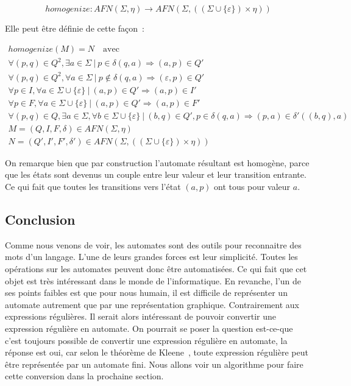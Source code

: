 \[
    homogenize: AFN(\Sigma, \eta) \to AFN(\Sigma, ((\Sigma \cup \{\varepsilon\}) \times \eta))
\]

Elle peut être définie de cette façon~:

\begin{gather*}
    homogenize(M) = N \quad \text{avec}                                                          \\
    \forall (p, q) \in Q^2, \exists a \in \Sigma ~|~ p \in \delta(q, a) \Rightarrow (a, p) \in Q' \\
    \forall (p, q) \in Q^2, \forall a \in \Sigma ~|~ p \notin \delta(q, a)
    \Rightarrow (\varepsilon, p) \in Q' \\
    \forall p \in I, \forall a \in \Sigma \cup \{\varepsilon\} ~|~ (a, p) \in Q' \Rightarrow (a, p) \in I' \\
    \forall p \in F, \forall a \in \Sigma \cup \{\varepsilon\} ~|~ (a, p) \in Q' \Rightarrow (a, p) \in F' \\
    \forall (p, q) \in Q, \exists a \in \Sigma, \forall b \in \Sigma \cup \{\varepsilon\} ~|~ (b, q) \in Q', p \in \delta(q, a) \Rightarrow (p, a) \in \delta'((b, q), a) \\
    M = (Q, I, F, \delta) \in AFN(\Sigma, \eta) \\
    N = (Q', I', F', \delta') \in AFN(\Sigma, ((\Sigma \cup \{\varepsilon\})
    \times \eta))
\end{gather*}

On remarque bien que par construction l'automate résultant est homogène, parce
que les états sont devenus un couple entre leur valeur et leur transition
entrante. Ce qui fait que toutes les transitions vers l'état \((a, p)\) ont
tous pour valeur \(a\).

\subsection{Conclusion}

Comme nous venons de voir, les automates sont des outils pour reconnaitre des
mots d'un langage. L'une de leurs grandes forces est leur simplicité. Toutes
les opérations sur les automates peuvent donc être automatisées. Ce qui fait
que cet objet est très intéressant dans le monde de l'informatique. En
revanche, l'un de ses points faibles est que pour nous humain, il est difficile
de représenter un automate autrement que par une représentation graphique.
Contrairement aux expressions régulières. Il serait alors intéressant de
pouvoir convertir une expression régulière en automate. On pourrait se poser la
question \og{}est-ce-que c'est toujours possible de convertir une expression
régulière en automate\fg{}, la réponse est oui, car selon le théorème de
Kleene~\cite{Kleene1951RepresentationOE}, toute expression régulière peut être
représentée par un automate fini. Nous allons voir un algorithme pour faire
cette conversion dans la prochaine section.
